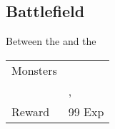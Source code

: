 \subsection{Battlefield}
\label{map:battlefield_04}

Between the  and the 

\begin{longtable}{ l p{9cm} }
	Monsters
	& \nameref{monster:mint_mint} \\
	& \nameref{monster:mint_mint}, \nameref{monster:mint_mint}
\\
	Reward & 99 Exp
\end{longtable}
